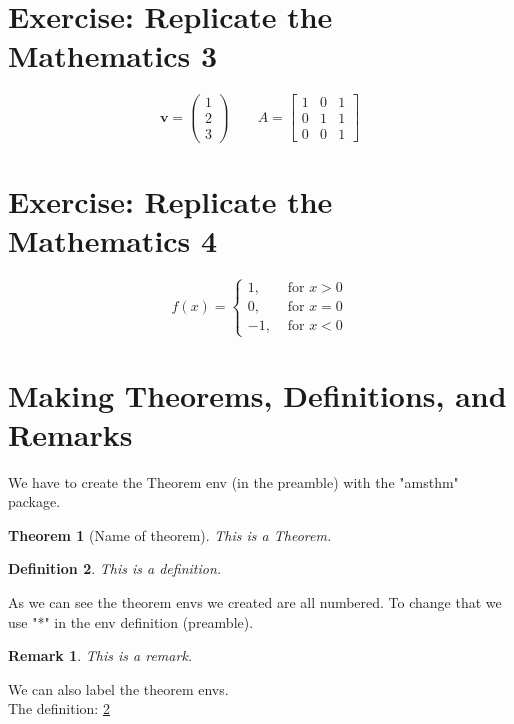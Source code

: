\documentclass[12pt,titlepage]{article}
\newtheorem{theorem}{Theorem}[section] %
\newtheorem{definition}[theorem]{Definition}
\newtheorem*{remark}{Remark}
\begin{document}
\section{Exercise: Replicate the Mathematics 3}
\[
    \mathbf{v}=
    \begin{pmatrix}
        1 \\ 2 \\ 3
    \end{pmatrix}
    \qquad A = 
    \begin{bmatrix}
        1 & 0 & 1 \\
        0 & 1 & 1 \\
        0 & 0 & 1
    \end{bmatrix}
\]  

\section{Exercise: Replicate the Mathematics 4}
\[
    f(x)=
    \begin{cases}
        1, & \text{ for } x > 0 \\
        0, & \text{ for } x = 0 \\
        -1, & \text{ for } x < 0
    \end{cases}
\]

\newpage
\section{Making Theorems, Definitions, and Remarks} \label{section: Making Theorems}
We have to create the Theorem env (in the preamble) with the "amsthm" package.

\begin{theorem}[Name of theorem] %
    This is a Theorem.
\end{theorem}

\begin{definition} \label{def: This is definition}
    This is a definition.
\end{definition}

As we can see the theorem envs we created are all numbered. To change that we use "*" in the env definition (preamble).

\begin{remark}
    This is a remark.
\end{remark}

We can also label the theorem envs. \\
The definition: \ref{def: This is definition}\\
\end{document}
